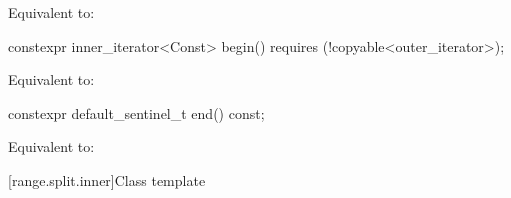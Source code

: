 \documentclass{wg21}
\begin{document}
\begin{itemdescr}
\pnum
\effects Equivalent to: 
\end{itemdescr}


\begin{addedblock}
\begin{itemdecl}
constexpr inner_iterator<Const> begin() requires (!copyable<outer_iterator>);
\end{itemdecl}

\begin{itemdescr}
\pnum
\effects Equivalent to: 
\end{itemdescr}
\end{addedblock}

%
\begin{itemdecl}
constexpr default_sentinel_t end() const;
\end{itemdecl}

\begin{itemdescr}
\pnum
\effects Equivalent to: 
\end{itemdescr}

[range.split.inner]{Class template }
\end{document}
